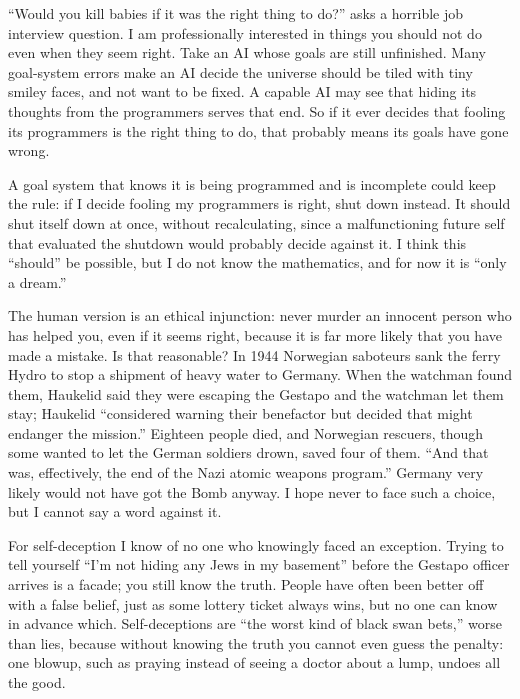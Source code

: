 
``Would you kill babies if it was the right thing to do?'' asks a horrible job interview question. I am professionally interested in things you should not do even when they seem right. Take an AI whose goals are still unfinished. Many goal-system errors make an AI decide the universe should be tiled with tiny smiley faces, and not want to be fixed. A capable AI may see that hiding its thoughts from the programmers serves that end. So if it ever decides that fooling its programmers is the right thing to do, that probably means its goals have gone wrong.

A goal system that knows it is being programmed and is incomplete could keep the rule: if I decide fooling my programmers is right, shut down instead. It should shut itself down at once, without recalculating, since a malfunctioning future self that evaluated the shutdown would probably decide against it. I think this ``should'' be possible, but I do not know the mathematics, and for now it is ``only a dream.'' 

The human version is an ethical injunction: never murder an innocent person who has helped you, even if it seems right, because it is far more likely that you have made a mistake. Is that reasonable? In 1944 Norwegian saboteurs sank the ferry Hydro to stop a shipment of heavy water to Germany. When the watchman found them, Haukelid said they were escaping the Gestapo and the watchman let them stay; Haukelid ``considered warning their benefactor but decided that might endanger the mission.'' Eighteen people died, and Norwegian rescuers, though some wanted to let the German soldiers drown, saved four of them. ``And that was, effectively, the end of the Nazi atomic weapons program.''  Germany very likely would not have got the Bomb anyway. I hope never to face such a choice, but I cannot say a word against it.

For self-deception I know of no one who knowingly faced an exception. Trying to tell yourself ``I'm not hiding any Jews in my basement'' before the Gestapo officer arrives is a facade; you still know the truth. People have often been better off with a false belief, just as some lottery ticket always wins, but no one can know in advance which. Self-deceptions are ``the worst kind of black swan bets,'' worse than lies, because without knowing the truth you cannot even guess the penalty: one blowup, such as praying instead of seeing a doctor about a lump, undoes all the good.

